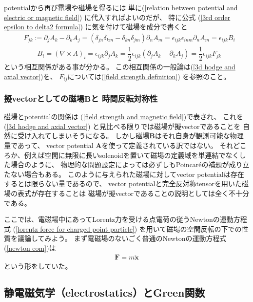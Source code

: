 potentialから再び電場や磁場を得るには
単に(\ref{relation between potential and electric or magnetic field})
に代入すればよいのだが、
特に公式
(\ref{3rd order epsilon to delta2 formula})
に気を付けて磁場を成分で書くと
\begin{subequations}
\begin{align}
  & F_{jk} :=
  \partial_j A_k - \partial_k A_j
=
  (\delta_{jn} \delta_{km}
  - \delta_{kn} \delta_{jm})
  \partial_n A_m
=
  \epsilon_{ijk} \epsilon_{inm}
  \partial_n A_m
=
  \epsilon_{ijk} B_i
\\
  & \qquad B_i =
  (\nabla \times A)_i =
  \epsilon_{ijk} \partial_j A_k
=
  \dfrac{1}{2}
  \epsilon_{ijk}
  ( \partial_j A_k
  - \partial_k A_j )
=
  \dfrac{1}{2}
  \epsilon_{ijk}
  F_{jk}
\end{align}
\label{field strength and magnetic field}
\end{subequations}
という相互関係がある事が分かる。
この相互関係の一般論は(\ref{3d hodge and axial vector})を、
$F_{ij}$については(\ref{field strength definition})
を参照のこと。

\subsubsection{擬vectorとしての磁場$\bm{B}$と
時間反転対称性}

磁場とpotentialの関係は
(\ref{field strength and magnetic field})で表され、
これを(\ref{3d hodge and axial vector})
と見比べる限りでは磁場が擬vectorであることを
自然に受け入れてしまいそうになる。
しかし磁場$\bm{B}$はそれ自身が観測可能な物理量であって、
vector potential $\bm{A}$を使って定義されている訳ではない。
それどころか、例えば空間に無限に長いsolenoidを置いて磁場の定義域を単連結でなくした場合のように、
物理的な問題設定によっては必ずしもPoincar\'eの補題が成り立たない場合もある。
このように与えられた磁場に対してvector potentialは存在するとは限らない量であるので、
vector potentialと完全反対称tensorを用いた磁場の表式が存在することは
磁場が擬vectorであることの説明としては全く不十分である。

ここでは、電磁場中にあってLorentz力を受ける点電荷の従うNewtonの運動方程式
(\ref{lorentz force for charged point particle})
を用いて磁場の空間反転の下での性質を議論してみよう。
まず電磁場のないごく普通のNewtonの運動方程式(\ref{newton eom})は
\begin{align}
  \bm{F} = m \ddot{ \bm{x} }
\end{align}
という形をしていた。

\subsection{静電磁気学（electrostatics）とGreen関数}


